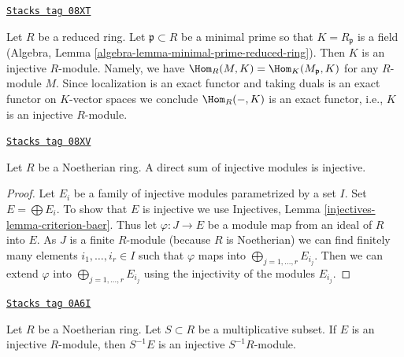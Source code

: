 \begin{example}
\label{dualizing-example-reduced-ring-injective}
\href{https://stacks.math.columbia.edu/tag/08XT}{\texttt{Stacks tag 08XT}}

Let $R$ be a reduced ring. Let $\mathfrak p \subset R$ be a minimal prime
so that $K = R_\mathfrak p$ is a field
(Algebra, Lemma \ref{algebra-lemma-minimal-prime-reduced-ring}).
Then $K$ is an injective $R$-module. Namely, we have
$\Hom_R(M, K) = \Hom_K(M_\mathfrak p, K)$ for any $R$-module
$M$. Since localization is an exact functor and taking duals is
an exact functor on $K$-vector spaces we conclude $\Hom_R(-, K)$
is an exact functor, i.e., $K$ is an injective $R$-module.
\end{example}

\begin{lemma}
\label{dualizing-lemma-sum-injective-modules}
\href{https://stacks.math.columbia.edu/tag/08XV}{\texttt{Stacks tag 08XV}}

Let $R$ be a Noetherian ring. A direct sum of injective modules
is injective.
\end{lemma}

\begin{proof}
Let $E_i$ be a family of injective modules parametrized by a set $I$.
Set $E = \bigoplus E_i$. To show that $E$ is injective we use
Injectives, Lemma \ref{injectives-lemma-criterion-baer}.
Thus let $\varphi : J \to E$ be a module map from an ideal of $R$
into $E$. As $J$ is a finite $R$-module (because $R$ is Noetherian)
we can find finitely many elements $i_1, \ldots, i_r \in I$
such that $\varphi$ maps into $\bigoplus_{j = 1, \ldots, r} E_{i_j}$.
Then we can extend $\varphi$ into $\bigoplus_{j = 1, \ldots, r} E_{i_j}$
using the injectivity of the modules $E_{i_j}$.
\end{proof}

\begin{lemma}
\label{dualizing-lemma-localization-injective-modules}
\href{https://stacks.math.columbia.edu/tag/0A6I}{\texttt{Stacks tag 0A6I}}

Let $R$ be a Noetherian ring. Let $S \subset R$ be a multiplicative
subset. If $E$ is an injective $R$-module, then $S^{-1}E$ is an
injective $S^{-1}R$-module.
\end{lemma}

